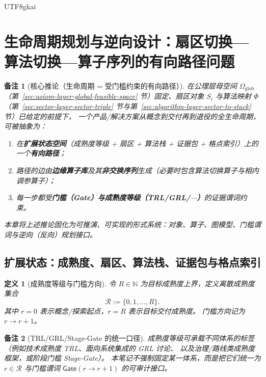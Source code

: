 \documentclass[12pt]{article}
\newtheorem{definition}{定义}[section]
\newtheorem{remark}{备注}[section]
\newcommand{\NN}{\mathbb{N}}
\begin{document}
\begin{CJK*}{UTF8}{gkai}
\section{生命周期规划与逆向设计：扇区切换—算法切换—算子序列的有向路径问题}
\label{sec:lifecycle-planning-inverse-design}

\begin{remark}[核心推论（生命周期 = 受门槛约束的有向路径）]
在公理层母空间 $\Omega_{\mathrm{glob}}$（第~\ref{sec:axiom-layer-global-feasible-space} 节）固定、扇区对象 $S_i$ 与算法映射 $\Phi$（第~\ref{sec:sector-layer-sector-triple} 节与第~\ref{sec:algorithm-layer-sector-to-stack} 节）已给定的前提下，
一个产品/解决方案从概念到交付再到退役的全生命周期，可被抽象为：
\begin{enumerate}
  \item 在\textbf{扩展状态空间}（成熟度等级 + 扇区 + 算法栈 + 证据包 + 格点索引）上的一个\textbf{有向路径}；
  \item 路径的边由\textbf{边缘算子库}及其\textbf{非交换序列}生成（必要时包含算法切换算子与相内调参算子）；
  \item 每一步都受\textbf{门槛（Gate）与成熟度等级（TRL/GRL/\,$\cdots$）}的证据谓词约束。
\end{enumerate}
本章将上述推论固化为可推演、可实现的形式系统：对象、算子、图模型、门槛谓词与逆向（反向）规划接口。
\end{remark}

\subsection{扩展状态：成熟度、扇区、算法栈、证据包与格点索引}
\label{sec:lifecycle-extended-state}

\begin{definition}[成熟度等级与门槛方向]
令 $R\in\NN$ 为目标成熟度上界，定义离散成熟度集合
\[
  \mathcal{R}:=\{0,1,\dots,R\}.
\]
其中 $r=0$ 表示概念/探索起点，$r=R$ 表示目标交付成熟度。
门槛方向记为 $r\to r+1$。
\end{definition}

\begin{remark}[TRL/GRL/Stage-Gate 的统一口径]
成熟度等级可承载不同体系的标签（例如技术成熟度 \textsf{TRL}\cite{ref_nasa_trl}、面向系统集成的 \textsf{GRL} 讨论\cite{ref_energycentral_grl}、
以及治理/路线类成熟度框架\cite{ref_oecd_advanced_materials}，或阶段门槛 \textsf{Stage-Gate}\cite{ref_stage_gate_dtl}）。
本笔记不强制固定某一体系，而是把它们统一为 $r\in\mathcal{R}$ 与门槛谓词 $\mathsf{Gate}(r\to r+1)$ 的可审计接口。
\end{remark}


\end{CJK*}
\end{document}
